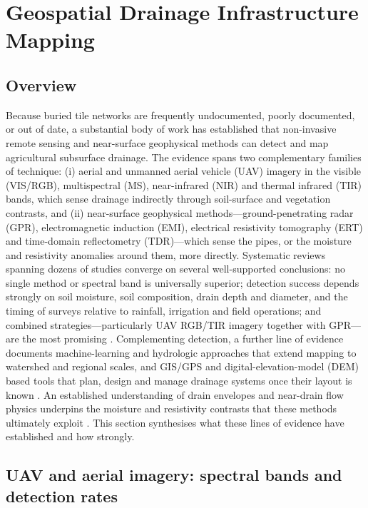 \documentclass[11pt]{article}
\begin{document}
\section*{Geospatial Drainage Infrastructure Mapping}

\subsection{Overview}

Because buried tile networks are frequently undocumented, poorly documented, or out of date, a substantial body of work has established that non-invasive remote sensing and near-surface geophysical methods can detect and map agricultural subsurface drainage. The evidence spans two complementary families of technique: (i) aerial and unmanned aerial vehicle (UAV) imagery in the visible (VIS/RGB), multispectral (MS), near-infrared (NIR) and thermal infrared (TIR) bands, which sense drainage indirectly through soil-surface and vegetation contrasts, and (ii) near-surface geophysical methods---ground-penetrating radar (GPR), electromagnetic induction (EMI), electrical resistivity tomography (ERT) and time-domain reflectometry (TDR)---which sense the pipes, or the moisture and resistivity anomalies around them, more directly. Systematic reviews spanning dozens of studies converge on several well-supported conclusions: no single method or spectral band is universally superior; detection success depends strongly on soil moisture, soil composition, drain depth and diameter, and the timing of surveys relative to rainfall, irrigation and field operations; and combined strategies---particularly UAV RGB/TIR imagery together with GPR---are the most promising \parencite{Carlsen2024,Wienken2024,Koganti2021}. Complementing detection, a further line of evidence documents machine-learning and hydrologic approaches that extend mapping to watershed and regional scales, and GIS/GPS and digital-elevation-model (DEM) based tools that plan, design and manage drainage systems once their layout is known \parencite{Cho2019,Yimer2023,Shedekar2018,Falasy2024,Falasy2025,Falasy2025b}. An established understanding of drain envelopes and near-drain flow physics underpins the moisture and resistivity contrasts that these methods ultimately exploit \parencite{Stuyt2006}. This section synthesises what these lines of evidence have established and how strongly.

\subsection{UAV and aerial imagery: spectral bands and detection rates}
\end{document}
